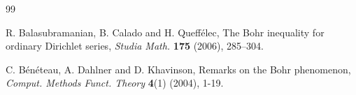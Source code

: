 \documentclass[a4paper,12pt]{amsart}
\theoremstyle{definition}
\begin{document}
\begin{thebibliography}{99}
	
	
	
	
	 {\sc R. Balasubramanian}, {\sc B. Calado} and {\sc H. Queffélec}, The Bohr inequality for ordinary Dirichlet series, {\it Studia Math.} {\bf 175} (2006), 285--304.
	
	 {\sc C. B{\'e}n{\'e}teau}, {\sc A. Dahlner} and {\sc D. Khavinson}, Remarks on the Bohr phenomenon, {\it Comput. Methods Funct. Theory} \textbf{4}(1) (2004), 1-19.
	
	
	
	
	
	

\end{thebibliography}
\end{document}
